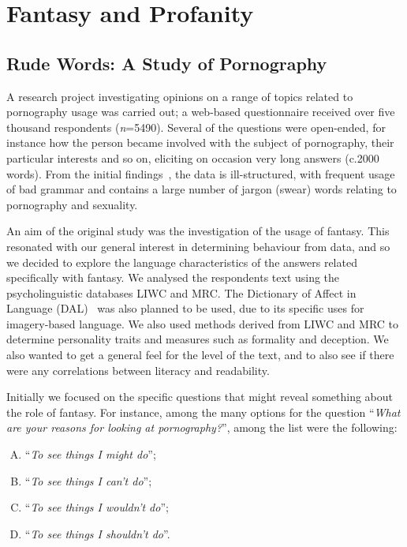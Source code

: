 \documentclass{AISB2008}
\begin{document}
\section{Fantasy and Profanity}

\subsection{Rude Words: A Study of Pornography}

A research project investigating opinions on a range of topics related
to pornography usage was carried out; a web-based questionnaire
received over five thousand respondents ({\emph{n}}=5490). Several of
the questions were open-ended, for instance how the person became
involved with the subject of pornography, their particular interests
and so on, eliciting on occasion very long answers (c.2000
words). From the initial findings~\cite{smith-et-al:2013}, the data is
ill-structured, with frequent usage of bad grammar and contains a
large number of jargon (swear) words relating to pornography and
sexuality.

An aim of the original study was the investigation of the usage of
fantasy. This resonated with our general interest in determining
behaviour from data, and so we decided to explore the language
characteristics of the answers related specifically with fantasy. We
analysed the respondents text using the psycholinguistic databases
LIWC and MRC. The Dictionary of Affect in Language
(DAL)~\cite{sweeney+whissell:1984} was also planned to be used, due to
its specific uses for imagery-based language. We also used methods
derived from LIWC and MRC to determine personality traits and measures
such as formality and deception. We also wanted to get a general feel
for the level of the text, and to also see if there were any
correlations between literacy and readability.

Initially we focused on the specific questions that might reveal
something about the role of fantasy. For instance, among the many
options for the question ``{\emph{What are your reasons for looking at
pornography?}}'', among the list were the following:

\begin{enumerate}[(A)]
\item ``{\emph{To see things I might do}}'';
\item ``{\emph{To see things I can't do}}'';
\item ``{\emph{To see things I wouldn't do}}'';
\item ``{\emph{To see things I shouldn't do}}''.
\end{enumerate}
\end{document}
